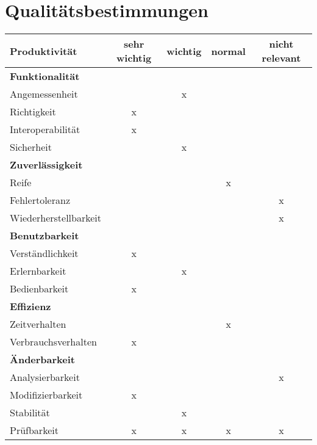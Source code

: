 \documentclass[parskip=full,11pt]{scrartcl}
\begin{document}
\section{Qualitätsbestimmungen}

\renewcommand{\arraystretch}{1.5}
\begin{table}[H]
  \begin{center}
    \begin{tabularx}{\textwidth}{X c c c c}
      \hline
      
      \textbf{{\large Produktivität}} & \textbf{{\large sehr wichtig}} & \textbf{{\large wichtig}} & \textbf{{\large normal} } &\textbf{{\large nicht relevant }}\\
      
      \hline      
      \multicolumn{5}{l}{\textbf{Funktionalität}}\\      
      \hline      
      Angemessenheit &   & x &   &  \\
	  Richtigkeit & x &   &   &  \\
	  Interoperabilität & x &   &   &  \\
      Sicherheit &   & x &   &  \\	
		    
	  \hline	  
      \multicolumn{5}{l}{\textbf{Zuverlässigkeit}}\\     
      \hline
      Reife &   &   & x &  \\
	  Fehlertoleranz &   &   &   & x\\
	  Wiederherstellbarkeit &   &   &   & x\\
		
	  \hline	  	
	  \multicolumn{5}{l}{\textbf{Benutzbarkeit}}\\
      \hline
      Verständlichkeit & x &   &   &  \\
	  Erlernbarkeit &   & x &   &  \\
	  Bedienbarkeit & x &   &   &  \\
	  
	  \hline	  	
	  \multicolumn{5}{l}{\textbf{Effizienz}}\\
      \hline
      Zeitverhalten &   &   & x &  \\
	  Verbrauchsverhalten & x &   &   &  \\	
	  
	  \hline	  	
	  \multicolumn{5}{l}{\textbf{Änderbarkeit}}\\
      \hline
      Analysierbarkeit &   &   &   & x\\
	  Modifizierbarkeit & x &   &   &  \\
	  Stabilität &   & x &   &  \\
	  Prüfbarkeit & x & x & x & x\\
	  

\end{tabularx}
\end{center}
\end{table}
\end{document}
